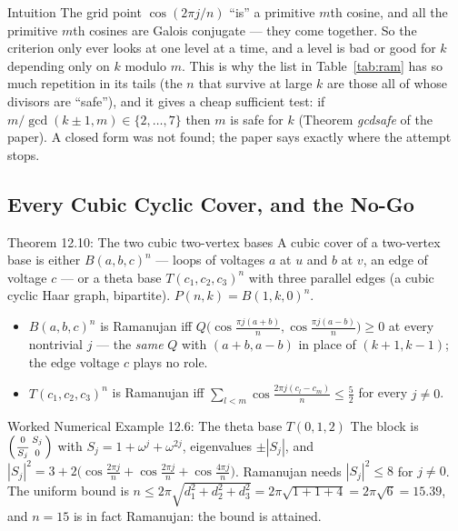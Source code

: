 \documentclass[11pt]{article}
\begin{document}
\begin{intubox}{Intuition}
The grid point $\cos(2\pi j/n)$ ``is'' a primitive $m$th cosine, and all the primitive $m$th cosines are Galois conjugate --- they come together. So the criterion only ever looks at one level at a time, and a level is bad or good for $k$ depending only on $k$ modulo $m$. This is why the list in Table~\ref{tab:ram} has so much repetition in its tails (the $n$ that survive at large $k$ are those all of whose divisors are ``safe''), and it gives a cheap sufficient test: if $m/\gcd(k\pm1,m)\in\{2,\dots,7\}$ then $m$ is safe for $k$ (Theorem \emph{gcdsafe} of the paper). A closed form was not found; the paper says exactly where the attempt stops.
\end{intubox}

\subsection{Every Cubic Cyclic Cover, and the No-Go}

\begin{thmbox}{Theorem 12.10: The two cubic two-vertex bases}
A cubic cover of a two-vertex base is either $B(a,b,c)^n$ --- loops of voltages $a$ at $u$ and $b$ at $v$, an edge of voltage $c$ --- or a theta base $T(c_1,c_2,c_3)^n$ with three parallel edges (a cubic cyclic Haar graph, bipartite). $P(n,k)=B(1,k,0)^n$.
\begin{itemize}[leftmargin=*,nosep]
  \item $B(a,b,c)^n$ is Ramanujan iff $Q\bigl(\cos\frac{\pi j(a+b)}{n},\cos\frac{\pi j(a-b)}{n}\bigr)\ge0$ at every nontrivial $j$ --- the \emph{same} $Q$ with $(a+b,a-b)$ in place of $(k+1,k-1)$; the edge voltage $c$ plays no role.
  \item $T(c_1,c_2,c_3)^n$ is Ramanujan iff $\sum_{l<m}\cos\frac{2\pi j(c_l-c_m)}{n}\le\frac52$ for every $j\ne0$.
\end{itemize}
\end{thmbox}

\begin{callbox}{Worked Numerical Example 12.6: The theta base $T(0,1,2)$}
The block is $\begin{psmallmatrix}0&S_j\\\overline{S_j}&0\end{psmallmatrix}$ with $S_j=1+\omega^j+\omega^{2j}$, eigenvalues $\pm|S_j|$, and $|S_j|^2=3+2\bigl(\cos\tfrac{2\pi j}{n}+\cos\tfrac{2\pi j}{n}+\cos\tfrac{4\pi j}{n}\bigr)$. Ramanujan needs $|S_j|^2\le8$ for $j\ne0$. The uniform bound is $n\le2\pi\sqrt{d_1^2+d_2^2+d_3^2}=2\pi\sqrt{1+1+4}=2\pi\sqrt6=15.39$, and $n=15$ is in fact Ramanujan: the bound is attained.
\end{callbox}
\end{document}
